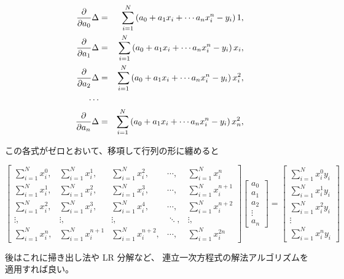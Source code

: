 \documentclass[12pt]{jsarticle}
\def\sumdata{\sum_{i=1}^{N}}
\begin{document}
\begin{eqnarray*}
  \partd{}{a_0} \Delta &=& \sumdata \left(
  a_0 + a_1 x_i + \cdots a_n x_i^n  - y_i  \right) 1, \nonumber \\
  \partd{}{a_1} \Delta &=& \sumdata \left(
  a_0 + a_1 x_i + \cdots a_n x_i^n  - y_i  \right) x_i, \nonumber \\
  \partd{}{a_2} \Delta &=& \sumdata \left(
  a_0 + a_1 x_i + \cdots a_n x_i^n  - y_i  \right) x_i^2, \nonumber \\
  \cdots \nonumber \\
  \partd{}{a_n} \Delta &=& \sumdata \left(
  a_0 + a_1 x_i + \cdots a_n x_i^n  - y_i  \right) x_n^2, \nonumber \\
\end{eqnarray*}

この各式がゼロとおいて、移項して行列の形に纏めると

\begin{equation}
  \begin{bmatrix}
    \sumdata x_i^0, & \sumdata x_i^1, & \sumdata x_i^2,
    & \cdots, & \sumdata x_i^n \\
    \sumdata x_i^1, & \sumdata x_i^2, & \sumdata x_i^3,
    & \cdots, & \sumdata x_i^{n+1} \\
    \sumdata x_i^2, & \sumdata x_i^3, & \sumdata x_i^4,
    & \cdots, & \sumdata x_i^{n+2} \\
    \vdots, & \vdots, & \vdots, & \ddots, & \vdots, \\
    \sumdata x_i^n, & \sumdata x_i^{n+1} & \sumdata x_i^{n+2},
    & \cdots, & \sumdata x_i^{2n}
  \end{bmatrix}
  \begin{bmatrix}
    a_0 \\ a_1 \\ a_2 \\ \vdots \\ a_n
  \end{bmatrix}
  =
  \begin{bmatrix}
    \sumdata x_i^0 y_i \\
    \sumdata x_i^1 y_i \\
    \sumdata x_i^2 y_i \\
    \vdots \\
    \sumdata x_i^n y_i
  \end{bmatrix}
\end{equation}

後はこれに掃き出し法や LR 分解など、
連立一次方程式の解法アルゴリズムを適用すれば良い。
\end{document}
